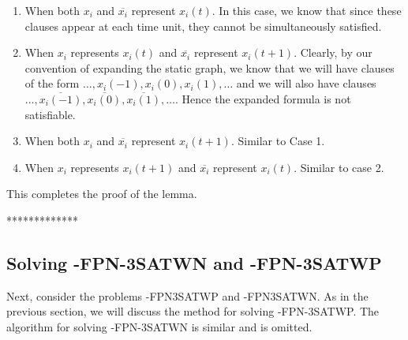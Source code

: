 \begin{enumerate}
\item
When both $x_i$ and $\overline{x_i}$ represent $x_i(t)$. In this case,
we know that since these clauses appear at each time unit, they cannot be
simultaneously satisfied.

\item
When $x_i$ represents $x_i(t)$ and $\overline{x_i}$ represent $x_i(t+1)$.
 Clearly, by our convention of expanding
the static graph, we know that we will have clauses of the form
$\ldots, x_i(-1), x_i(0), x_i(1), \ldots$ and we will also have clauses
$\ldots, \overline{x_i(-1)}, \overline{x_i(0)}, \overline{x_i(1)}, \ldots$.
Hence the expanded formula is not satisfiable.

\item
When both $x_i$ and $\overline{x_i}$ represent $x_i(t+1)$. Similar to Case 1.

\item
When $x_i$ represents $x_i(t+1)$ and 
$\overline{x_i}$ represent $x_i(t)$.  Similar to case 2.
\end{enumerate}
This completes the proof of the lemma. \hfill\QED

*************
\fi





\subsection{Solving {-FPN-3SATWN} and  {-FPN-3SATWP}}
Next, consider the problems {-FPN3SATWP} and {-FPN3SATWN}. 
As in the previous section, we will discuss the method for solving 
{-FPN-3SATWP}. The algorithm for solving {-FPN-3SATWN} is 
similar and is omitted.


\iffalse
The algorithm for solving {\sf 1-FPN-3SATWP} 
is little more subtler then solving an
instance of {\sf 1-PN-3SATWP}. To see this observe that  in case
of {\sf 1-PN-3SATWP}, whenever we have a clause of the form $x_i(t)$ or
$x_i(t+1)$, we have that all the copies of the variable $x_i$ are set to
true (A  similar argument applies for negated clauses). But in the
case of finite instances while a clause of  the form $x_i(t)$  implies that
$x_i$ is set to true for time periods, it is not necessarily true if there
is a clause of the form $x_i(t+1)$. Such a clause does not say anything 
about the value that has to be assigned to the variable $x_i(0)$. In fact, the 
following example shows that the only way the expanded formula is satisfied
is to assign different values to the copy of a particular variable.
\fi



